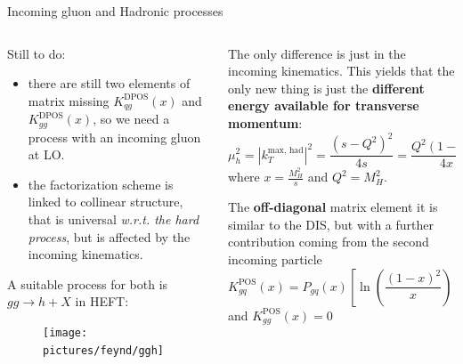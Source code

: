\documentclass[8pt]{beamer}
\DeclareMathOperator{\pos}{POS}
\DeclareMathOperator{\dpos}{DPOS}
\begin{document}
\begin{frame}{Incoming gluon and Hadronic processes}
    \begin{columns}
        \begin{column}{0.5\textwidth}
            Still to do:
            \begin{itemize}
                \item there are still two elements of matrix missing
                    $K_{qg}^{\dpos}(x)$ and $K_{gg}^{\dpos}(x)$, so we need a
                    process with an incoming gluon at LO.

                \item the factorization scheme is linked to collinear
                    structure, that is universal \textit{w.r.t. the hard
                    process}, but is affected by the \alert{incoming
                    kinematics}.
            \end{itemize}

            \vspace*{13pt}
            A suitable process for both is $gg\to h + X$ in HEFT:
            \begin{figure}
              \texttt{[image: pictures/feynd/ggh]}
            \end{figure}
        \end{column}
        \begin{column}{0.5\textwidth}
            The only difference is just in the incoming kinematics\footnotemark.
            This yields that the only new thing is just the \textbf{different energy available
            for transverse momentum}:
            \begin{equation*}\label{eq:ktmaxh}
                \mu_h^2=  |k_T^\text{max, had}|^2=\frac{(s-Q^2)^2}{4s}=\frac{Q^2(1-x)^2}{4x}
            \end{equation*}
            where $x=\frac{M_H^2}{s}$ and $ Q^2 = M_H^2 $.

            \vspace*{10pt}
            The \textbf{off-diagonal} matrix element it is similar to the DIS, but
            with a further contribution coming from the second incoming particle
            \begin{equation*}
                K_{gq}^{\pos} (x) =
                P_{gq}(x)\left[\ln\left(\frac{(1-x)^2}{x}\right) - 1\right]
            \end{equation*}
            and $K_{gg}^{\pos} (x) = 0$
        \end{column}
    \end{columns}


\end{frame}
\end{document}
